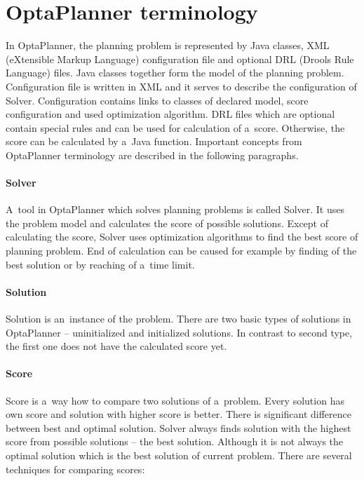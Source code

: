 \section{OptaPlanner terminology}\label{OptaPlannerTerminologySection}
In OptaPlanner, the planning problem is represented by Java classes, XML (eXtensible Markup Language) configuration file
and optional DRL (Drools Rule Language) files. Java classes together form the model of the planning problem.
Configuration file is written in XML and it serves to describe the configuration of Solver. Configuration contains
links to classes of declared model, score configuration and used optimization algorithm. DRL files which are optional
contain special rules and can be used for calculation of a~score. Otherwise, the score can be calculated by a~Java
function. Important concepts from OptaPlanner terminology are described in the following paragraphs.

\paragraph{Solver}
A~tool in OptaPlanner which solves planning problems is called Solver. It uses the problem model and calculates the
score of possible solutions. Except of calculating the score, Solver uses optimization algorithms to find the best score
of planning problem. End of calculation can be caused for example by finding of the best solution or by reaching of
a~time limit.

\paragraph{Solution}
Solution is an~instance of the problem. There are two basic types of solutions in OptaPlanner -- uninitialized and
initialized solutions. In contrast to second type, the first one does not have the calculated score yet.

\paragraph{Score}
Score is a~way how to compare two solutions of a~problem. Every solution has own score and solution with higher score is
better. There is significant difference between best and optimal solution. Solver always finds solution with the highest
score from possible solutions -- the best solution. Although it is not always the optimal solution which is the best
solution of current problem. There are several techniques for comparing scores:


